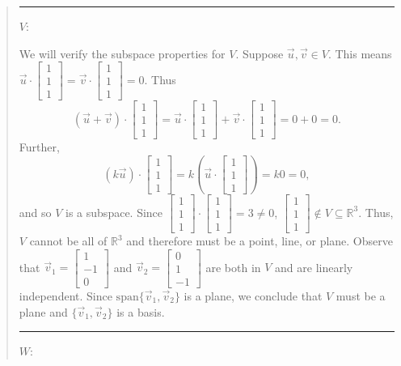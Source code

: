 \documentclass[letter]{article}
\newcommand{\R}{\mathbb{R}}
\newcommand{\Span}{\mathrm{span}}
\newcommand{\mat}[1]{\begin{bmatrix}#1\end{bmatrix}}
\begin{document}
\begin{enumerate}
\begin{quote}
				\vspace{.3cm}
				\hrule
				\vspace{.3cm}
				$V$:

				We will verify the subspace properties for $V$.  Suppose $\vec u,\vec v\in V$.  This means $\vec u\cdot\mat{1\\1\\1}=
				\vec v\cdot\mat{1\\1\\1}=0$.  Thus
				\[
					(\vec u+\vec v)\cdot\mat{1\\1\\1} = \vec u\cdot \mat{1\\1\\1}+\vec v\cdot\mat{1\\1\\1}=
					0+0=0.
				\]
				Further,
				\[
					(k\vec u)\cdot\mat{1\\1\\1}= k\left(\vec u\cdot\mat{1\\1\\1}\right) = k0=0,
				\]
				and so $V$ is a subspace.  Since $\mat{1\\1\\1}\cdot\mat{1\\1\\1} = 3\neq 0$, $\mat{1\\1\\1}\notin V\subseteq \R^3$.
				Thus, $V$ cannot be all of $\R^3$ and therefore must be a point, line, or plane.  Observe that $\vec v_1=\mat{1\\-1\\0}$
				and $\vec v_2=\mat{0\\1\\-1}$ are both in $V$ and are linearly independent.  Since 
				$\Span\{\vec v_1,\vec v_2\}$ is a plane, we conclude that $V$ must be a plane and $\{\vec v_1,\vec v_2\}$
				is a basis.

				\vspace{.3cm}
				\hrule
				\vspace{.3cm}
				$W$:


\end{quote}
\end{enumerate}
\end{document}
